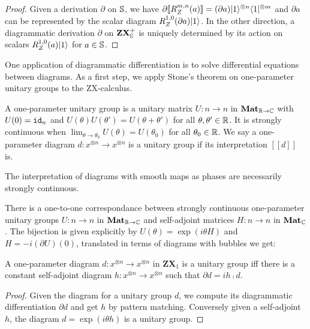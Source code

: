 \begin{proof}
Given a derivation $\partial$ on $\S$, we have
$\partial [\![R_Z^{m, n}(a)]\!]
= (\partial a) \ket{1}^{\otimes n} \bra{1}^{\otimes m}$
and $\partial a$ can be represented by the scalar diagram
$R_Z^{1, 0}(\partial a) \ket{1}$.
In the other direction, a diagrammatic derivation $\partial$ on
$\mathbf{ZX}_\S^+$ is uniquely determined by its action on scalars
$R_Z^{1, 0}(a) \ket{1}$ for $a \in \S$.
\end{proof}

One application of diagrammatic differentiation is to solve
differential equations between diagrams. As a first step,
we apply Stone's theorem \cite{Stone32} on one-parameter unitary groups
to the ZX-calculus.

\begin{definition}
A one-parameter unitary group is a unitary matrix $U : n \to n$
in $\mathbf{Mat}_{\R \to \C}$ with $U(0) = \id_n$ and $U(\theta) U(\theta') = U(\theta + \theta')$
for all $\theta, \theta' \in \R$. It is strongly continuous when
$\lim_{\theta \to \theta_0} U(\theta) = U(\theta_0)$ for all $\theta_0 \in \R$.
We say a one-parameter diagram $d : x^{\otimes n} \to x^{\otimes n}$
is a unitary group if its interpretation $[\![d]\!]$ is.
\end{definition}

\begin{remark}
The interpretation of diagrams with smooth maps as phases are necessarily strongly continuous.
\end{remark}

\begin{theorem}[Stone]
There is a one-to-one correspondance between strongly continuous one-parameter
unitary groups $U : n \to n$ in $\mathbf{Mat}_{\R \to \C}$ and self-adjoint
matrices $H : n \to n$ in $\mathbf{Mat}_{\C}$. The bijection is given
explicitly by $U(\theta) = \exp(i \theta H)$ and $H = - i (\partial U)(0)$,
translated in terms of diagrams with bubbles we get:
\end{theorem}

\begin{corollary}
A one-parameter diagram $d : x^{\otimes n} \to x^{\otimes n}$ in
$\mathbf{ZX}_1$ is a unitary group iff there is a constant
self-adjoint diagram
$h : x^{\otimes n} \to x^{\otimes n}$ such that $\partial d = i h \fcmp d$.
\end{corollary}

\begin{proof}
Given the diagram for a unitary group $d$, we compute its diagrammatic
differentiation $\partial d$ and get $h$ by pattern matching.
Conversely given a self-adjoint $h$, the diagram $d = \exp(i \theta h)$
is a unitary group.
\end{proof}

